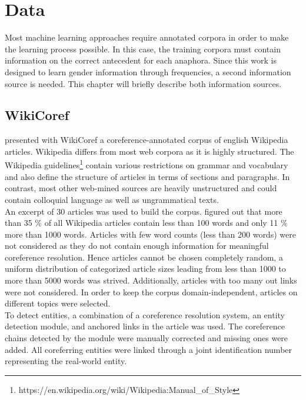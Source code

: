\chapter{Data}
\label{sec:Data}

Most machine learning approaches require annotated corpora in order to make the learning process possible. In this case, the training corpora must contain information on the correct antecedent for each anaphora. Since this work is designed to learn gender information through frequencies, a second information source is needed. This chapter will briefly describe both information sources.

\section{WikiCoref }
\label{wikicorefSec}
\cite{wikicoref2016} presented with WikiCoref a coreference-annotated corpus of english Wikipedia articles. Wikipedia differs from most web corpora as it is highly structured. The Wikipedia guidelines\footnote{https://en.wikipedia.org/wiki/Wikipedia:Manual\_of\_Style} contain various restrictions on grammar and vocabulary and also define the structure of articles in terms of sections and paragraphs. In contrast, most other web-mined sources are heavily unstructured and could contain colloquial language as well as ungrammatical texts. \\
An excerpt of 30 articles was used to build the corpus. \citep{wikicoref2016} figured out that more than 35 \% of all Wikipedia articles contain less than 100 words and only 11 \% more than 1000 words. Articles with few word counts (less than 200 words) were not considered as they do not contain enough information for meaningful coreference resolution. Hence articles cannot be chosen completely random, a uniform distribution of categorized article sizes leading from less than 1000 to more than 5000 words was strived. Additionally, articles with too many out links were not considered. In order to keep the corpus domain-independent, articles on different topics were selected.\\

To detect entities, a combination of a coreference resolution system, an entity detection module, and anchored links in the article was used. The coreference chains detected by the module were manually corrected and missing ones were added. All coreferring entities were linked through a joint identification number representing the real-world entity.

